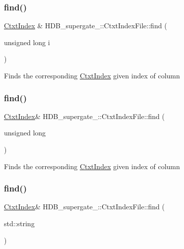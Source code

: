 \subsubsection{\texorpdfstring{find()}{find()}\hspace{0.1cm}{\footnotesize\ttfamily [1/4]}}
{\footnotesize\ttfamily \hyperlink{classHDB__supergate___1_1CtxtIndex}{Ctxt\+Index} \& H\+D\+B\+\_\+supergate\+\_\+\+::\+Ctxt\+Index\+File\+::find (\begin{DoxyParamCaption}\item[{unsigned long}]{i }\end{DoxyParamCaption})}

Finds the corresponding \hyperlink{classHDB__supergate___1_1CtxtIndex}{Ctxt\+Index} given index of column \mbox{\label{classHDB__supergate___1_1CtxtIndexFile_a22e64dc85f8e2ec050ee00820d31d083}} 
\subsubsection{\texorpdfstring{find()}{find()}\hspace{0.1cm}{\footnotesize\ttfamily [2/4]}}
{\footnotesize\ttfamily \hyperlink{classHDB__supergate___1_1CtxtIndex}{Ctxt\+Index}\& H\+D\+B\+\_\+supergate\+\_\+\+::\+Ctxt\+Index\+File\+::find (\begin{DoxyParamCaption}\item[{unsigned}]{long }\end{DoxyParamCaption})}

Finds the corresponding \hyperlink{classHDB__supergate___1_1CtxtIndex}{Ctxt\+Index} given index of column \mbox{\label{classHDB__supergate___1_1CtxtIndexFile_aa579ec2799b316a65f426356ca76efd8}} 
\subsubsection{\texorpdfstring{find()}{find()}\hspace{0.1cm}{\footnotesize\ttfamily [3/4]}}
{\footnotesize\ttfamily \hyperlink{classHDB__supergate___1_1CtxtIndex}{Ctxt\+Index}\& H\+D\+B\+\_\+supergate\+\_\+\+::\+Ctxt\+Index\+File\+::find (\begin{DoxyParamCaption}\item[{std\+::string}]{ }\end{DoxyParamCaption})}


